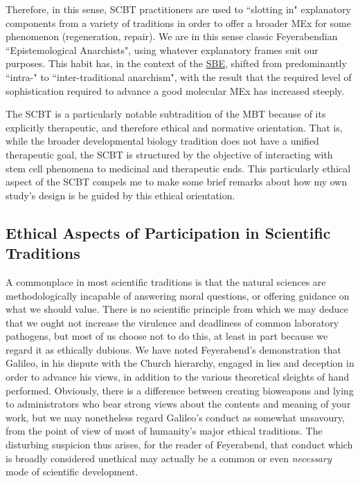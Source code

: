  Therefore, in this sense, SCBT practitioners are used to ``slotting in" explanatory components from a variety of traditions in order to offer a broader MEx for some phenomenon (regeneration, repair). We are in this sense classic Feyerabendian ``Epistemological Anarchists", using whatever explanatory frames suit our purposes. This habit has, in the context of the \hyperref[SBE]{SBE}, shifted from predominantly ``intra-" to ``inter-traditional anarchism", with the result that the required level of sophistication required to advance a good molecular MEx has increased steeply.
 
 The SCBT is a particularly notable subtradition of the MBT because of its explicitly therapeutic, and therefore ethical and normative orientation. That is, while the broader developmental biology tradition does not have a unified therapeutic goal, the SCBT is structured by the objective of interacting with stem cell phenomena to medicinal and therapeutic ends. This particularly ethical aspect of the SCBT compels me to make some brief remarks about how my own study's design is be guided by this ethical orientation.
 
\subsection{Ethical Aspects of Participation in Scientific Traditions}
\label{ethics}

A commonplace in most scientific traditions is that the natural sciences are methodologically incapable of answering moral questions, or offering guidance on what we should value. There is no scientific principle from which we may deduce that we ought not increase the virulence and deadliness of common laboratory pathogens, but most of us choose not to do this, at least in part because we regard it as ethically dubious. We have noted Feyerabend's demonstration that Galileo, in his dispute with the Church hierarchy, engaged in lies and deception in order to advance his views, in addition to the various theoretical sleights of hand performed. Obviously, there is a difference between creating bioweapons and lying to administrators who bear strong views about the contents and meaning of your work, but we may nonetheless regard Galileo's conduct as somewhat unsavoury, from the point of view of most of humanity's major ethical traditions. The disturbing suspicion thus arises, for the reader of Feyerabend, that conduct which is broadly considered unethical may actually be a common or even \textit{necessary} mode of scientific development.

